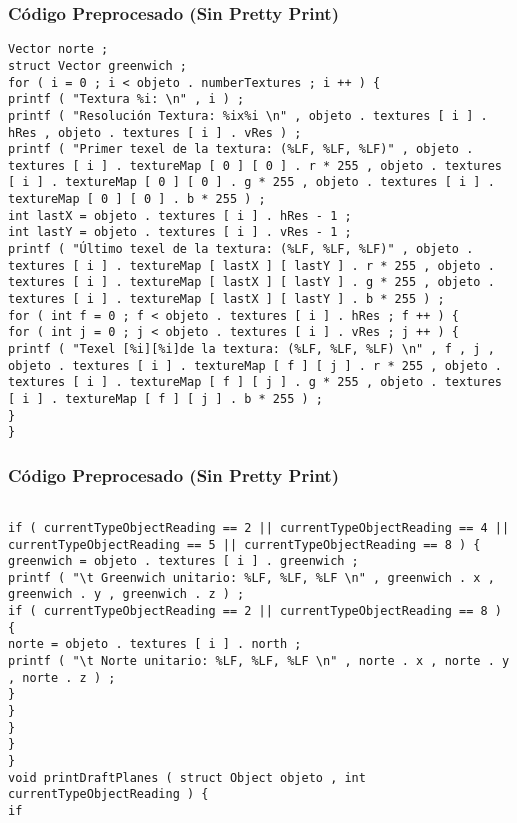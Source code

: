 \documentclass{beamer}
\begin{document}
\begin{frame}[fragile]
\frametitle{C\'odigo Preprocesado (Sin Pretty Print)}
\begin{lstlisting}[style=CStyle]
Vector norte ; 
struct Vector greenwich ; 
for ( i = 0 ; i < objeto . numberTextures ; i ++ ) { 
printf ( "Textura %i: \n" , i ) ; 
printf ( "Resolución Textura: %ix%i \n" , objeto . textures [ i ] . hRes , objeto . textures [ i ] . vRes ) ; 
printf ( "Primer texel de la textura: (%LF, %LF, %LF)" , objeto . textures [ i ] . textureMap [ 0 ] [ 0 ] . r * 255 , objeto . textures [ i ] . textureMap [ 0 ] [ 0 ] . g * 255 , objeto . textures [ i ] . textureMap [ 0 ] [ 0 ] . b * 255 ) ; 
int lastX = objeto . textures [ i ] . hRes - 1 ; 
int lastY = objeto . textures [ i ] . vRes - 1 ; 
printf ( "Último texel de la textura: (%LF, %LF, %LF)" , objeto . textures [ i ] . textureMap [ lastX ] [ lastY ] . r * 255 , objeto . textures [ i ] . textureMap [ lastX ] [ lastY ] . g * 255 , objeto . textures [ i ] . textureMap [ lastX ] [ lastY ] . b * 255 ) ; 
for ( int f = 0 ; f < objeto . textures [ i ] . hRes ; f ++ ) { 
for ( int j = 0 ; j < objeto . textures [ i ] . vRes ; j ++ ) { 
printf ( "Texel [%i][%i]de la textura: (%LF, %LF, %LF) \n" , f , j , objeto . textures [ i ] . textureMap [ f ] [ j ] . r * 255 , objeto . textures [ i ] . textureMap [ f ] [ j ] . g * 255 , objeto . textures [ i ] . textureMap [ f ] [ j ] . b * 255 ) ; 
} 
} \end{lstlisting}
\end{frame}
\begin{frame}[fragile]
\frametitle{C\'odigo Preprocesado (Sin Pretty Print)}
\begin{lstlisting}[style=CStyle]

if ( currentTypeObjectReading == 2 || currentTypeObjectReading == 4 || currentTypeObjectReading == 5 || currentTypeObjectReading == 8 ) { 
greenwich = objeto . textures [ i ] . greenwich ; 
printf ( "\t Greenwich unitario: %LF, %LF, %LF \n" , greenwich . x , greenwich . y , greenwich . z ) ; 
if ( currentTypeObjectReading == 2 || currentTypeObjectReading == 8 ) { 
norte = objeto . textures [ i ] . north ; 
printf ( "\t Norte unitario: %LF, %LF, %LF \n" , norte . x , norte . y , norte . z ) ; 
} 
} 
} 
} 
} 
void printDraftPlanes ( struct Object objeto , int currentTypeObjectReading ) { 
if \end{lstlisting}
\end{frame}
\end{document}
